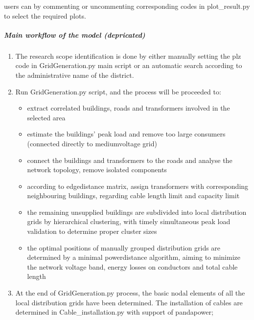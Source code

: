 \documentclass[letterpaper,10pt,english]{sphinxmanual}
\begin{document}
\sphinxAtStartPar
users can by commenting or uncommenting corresponding codes in plot\_result.py to select the required plots.


\subparagraph{Main workflow of the model (depricated)}
\label{\detokenize{grid_generation/main_workflow/main_workflow:main-workflow-of-the-model-depricated}}\begin{enumerate}
%
\item {} 
\sphinxAtStartPar
The research scope identification is done by either manually setting the plz code in GridGeneration.py main script or
an automatic search according to the administrative name of the district.

\item {} 
\sphinxAtStartPar
Run GridGeneration.py script, and the process will be proceeded to:
\begin{itemize}
\item {} 
\sphinxAtStartPar
extract correlated buildings, roads and transformers involved in the selected area

\item {} 
\sphinxAtStartPar
estimate the buildings’ peak load and remove too large consumers (connected directly to medium\sphinxhyphen{}voltage grid)

\item {} 
\sphinxAtStartPar
connect the buildings and transformers to the roads and analyse the network topology, remove isolated components

\item {} 
\sphinxAtStartPar
according to edge\sphinxhyphen{}distance matrix, assign transformers with corresponding neighbouring buildings, regarding cable
length limit and capacity limit

\item {} 
\sphinxAtStartPar
the remaining unsupplied buildings are subdivided into local distribution grids by hierarchical clustering, with
timely simultaneous peak load validation to determine proper cluster sizes

\item {} 
\sphinxAtStartPar
the optimal positions of manually grouped distribution grids are determined by a minimal power\sphinxhyphen{}distance algorithm,
aiming to minimize the network voltage band, energy losses on conductors and total cable length

\end{itemize}

\item {} 
\sphinxAtStartPar
At the end of GridGeneration.py process, the basic nodal elements of all the local distribution grids have been
determined. The installation of cables are determined in Cable\_installation.py with support of pandapower;


\end{enumerate}
\end{document}
